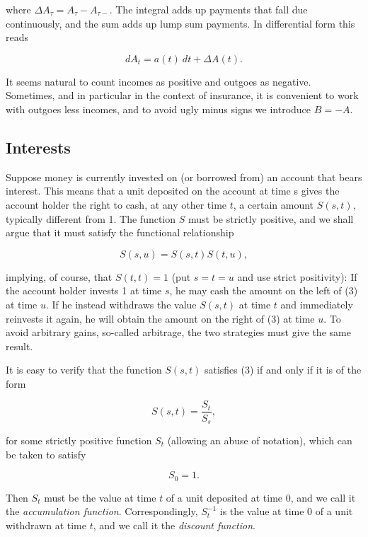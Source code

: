 \documentclass[a4paper,12pt,openany]{book}
\begin{document}
where \(\Delta A_\tau=A_\tau-A_{\tau-}\). The integral adds up payments that fall due continuously, and the sum adds up lump sum payments. In differential form this
reads

\[
dA_t=a(t)\ dt+\Delta A(t).\tag{2}
\]

It seems natural to count incomes as positive and outgoes as negative. Sometimes, and in particular in the context of insurance, it is convenient to work with outgoes less incomes, and to avoid ugly minus signs we introduce \(B = -A\).

\hypertarget{interests}{%
\subsection{Interests}\label{interests}}

Suppose money is currently invested on (or borrowed from) an account that bears interest. This means that a unit deposited on the account at time s gives the account holder the right to cash, at any other time \(t\), a certain amount \(S(s,t)\), typically different from 1. The function \(S\) must be strictly positive, and we shall argue that it must satisfy the functional relationship

\[
S(s, u) = S(s, t) S(t, u) ,\tag{3}
\]

implying, of course, that \(S(t,t) = 1\) (put \(s = t = u\) and use strict positivity): If the account holder invests 1 at time \(s\), he may cash the amount on the left of (3) at time \(u\). If he instead withdraws the value \(S(s,t)\) at time \(t\) and immediately reinvests it again, he will obtain the amount on the right of (3) at time \(u\). To avoid arbitrary gains, so-called arbitrage, the two strategies must give the same result.

It is easy to verify that the function \(S(s,t)\) satisfies (3) if and only if it is of the form

\[
S(s,t)=\frac{S_t}{S_s},\tag{4}
\]

for some strictly positive function \(S_t\) (allowing an abuse of notation), which can be taken to satisfy

\[
S_0=1.
\]

Then \(S_t\) must be the value at time \(t\) of a unit deposited at time 0, and we call it the \emph{accumulation function}. Correspondingly, \(S_t^{-1}\) is the value at time 0 of a unit withdrawn at time \(t\), and we call it the \emph{discount function}.
\end{document}

